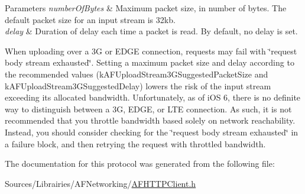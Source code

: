 \begin{DoxyParams}{Parameters}
{\em number\-Of\-Bytes} & Maximum packet size, in number of bytes. The default packet size for an input stream is 32kb. \\
\hline
{\em delay} & Duration of delay each time a packet is read. By default, no delay is set.\\
\hline
\end{DoxyParams}
When uploading over a 3\-G or E\-D\-G\-E connection, requests may fail with \char`\"{}request body stream exhausted\char`\"{}. Setting a maximum packet size and delay according to the recommended values ({\ttfamily k\-A\-F\-Upload\-Stream3\-G\-Suggested\-Packet\-Size} and {\ttfamily k\-A\-F\-Upload\-Stream3\-G\-Suggested\-Delay}) lowers the risk of the input stream exceeding its allocated bandwidth. Unfortunately, as of i\-O\-S 6, there is no definite way to distinguish between a 3\-G, E\-D\-G\-E, or L\-T\-E connection. As such, it is not recommended that you throttle bandwidth based solely on network reachability. Instead, you should consider checking for the \char`\"{}request body stream exhausted\char`\"{} in a failure block, and then retrying the request with throttled bandwidth. 

The documentation for this protocol was generated from the following file\-:\begin{DoxyCompactItemize}
\item 
Sources/\-Librairies/\-A\-F\-Networking/\hyperlink{_a_f_h_t_t_p_client_8h}{A\-F\-H\-T\-T\-P\-Client.\-h}\end{DoxyCompactItemize}
